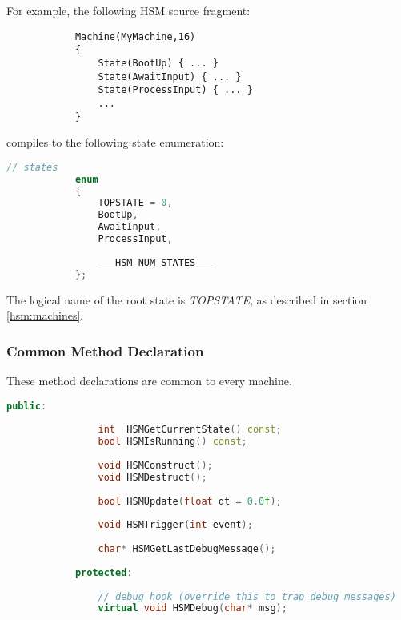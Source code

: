 \documentclass[titlepage,letterpaper]{report}
\begin{document}
For example, the following HSM source fragment:

\begin{lstlisting}
			Machine(MyMachine,16)
			{
				State(BootUp) { ... }
				State(AwaitInput) { ... }
				State(ProcessInput) { ... }
				...
			}
\end{lstlisting}

compiles to the following state enumeration:

\begin{lstlisting}[language=C++]
			// states
			enum
			{
				TOPSTATE = 0,
				BootUp,
				AwaitInput,
				ProcessInput,
			
				___HSM_NUM_STATES___
			};
\end{lstlisting}

The logical name of the root state is \emph{TOPSTATE}, as described in section \ref{hsm:machines}.

\subsubsection{Common Method Declaration}

These method declarations are common to every machine.

\begin{lstlisting}[language=C++]
			public:
			
				int  HSMGetCurrentState() const;
				bool HSMIsRunning() const;
			
				void HSMConstruct();
				void HSMDestruct();
			
				bool HSMUpdate(float dt = 0.0f);
			
				void HSMTrigger(int event);
			
				char* HSMGetLastDebugMessage();
			
			protected:
			
				// debug hook (override this to trap debug messages)
				virtual void HSMDebug(char* msg);
\end{lstlisting}
\end{document}
